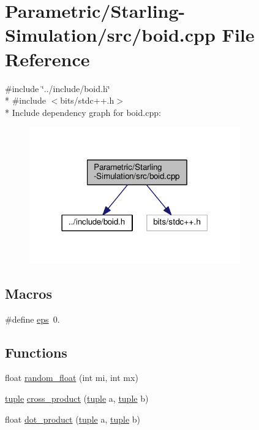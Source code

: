 \hypertarget{_parametric_2_starling-_simulation_2src_2boid_8cpp}{}\section{Parametric/\+Starling-\/\+Simulation/src/boid.cpp File Reference}
\label{_parametric_2_starling-_simulation_2src_2boid_8cpp}
{\ttfamily \#include \char`\"{}../include/boid.\+h\char`\"{}}\\*
{\ttfamily \#include $<$bits/stdc++.\+h$>$}\\*
Include dependency graph for boid.\+cpp\+:
\nopagebreak
\begin{figure}[H]
\begin{center}
\leavevmode
\includegraphics[width=258pt]{_parametric_2_starling-_simulation_2src_2boid_8cpp__incl}
\end{center}
\end{figure}
\subsection*{Macros}
\begin{DoxyCompactItemize}
\item 
\#define \hyperlink{_parametric_2_starling-_simulation_2src_2boid_8cpp_ab53328405fd9ba89990d9426d0e6389e}{eps}~0.
\end{DoxyCompactItemize}
\subsection*{Functions}
\begin{DoxyCompactItemize}
\item 
float \hyperlink{_parametric_2_starling-_simulation_2src_2boid_8cpp_a9594488b515ced509126c685b05f880f}{random\+\_\+float} (int mi, int mx)
\item 
\hyperlink{classtuple}{tuple} \hyperlink{_parametric_2_starling-_simulation_2src_2boid_8cpp_a314e8396c9d1befd9b196d3a5adc914f}{cross\+\_\+product} (\hyperlink{classtuple}{tuple} a, \hyperlink{classtuple}{tuple} b)
\item 
float \hyperlink{_parametric_2_starling-_simulation_2src_2boid_8cpp_a5d5b43174fcddb9d32055de5fffd3274}{dot\+\_\+product} (\hyperlink{classtuple}{tuple} a, \hyperlink{classtuple}{tuple} b)
\end{DoxyCompactItemize}


